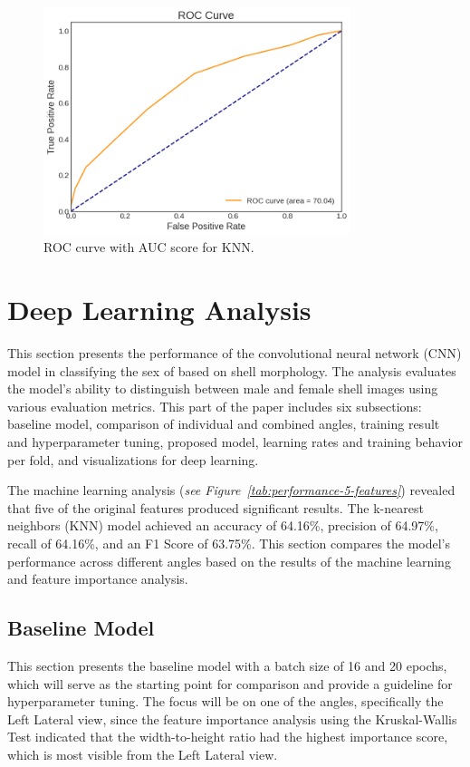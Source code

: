 \begin{figure}[!htbp]
	\centering
	\includegraphics[width=0.8\textwidth]{figures/roc_ml.png}
	\caption{ROC curve with AUC score for KNN.}
	\label{fig:roc_ml}
\end{figure}

\newpage
\section{Deep Learning Analysis}
This section presents the performance of the convolutional neural network (CNN) model in classifying the sex of \Tgranosa based on shell morphology. The analysis evaluates the model's ability to distinguish between male and female shell images using various evaluation metrics. This part of the paper includes six subsections: baseline model, comparison of individual and combined angles, training result and hyperparameter tuning, proposed model, learning rates and training behavior per fold, and visualizations for deep learning.

The machine learning analysis (\textit{see Figure~\ref{tab:performance-5-features}}) revealed that five of the original features produced significant results. The k-nearest neighbors (KNN) model achieved an accuracy of 64.16\%, precision of 64.97\%, recall of 64.16\%, and an F1 Score of 63.75\%. This section compares the model's performance across different angles based on the results of the machine learning and feature importance analysis.

\subsection{Baseline Model}
This section presents the baseline model with a batch size of 16 and 20 epochs, which will serve as the starting point for comparison and provide a guideline for hyperparameter tuning. The focus will be on one of the angles, specifically the Left Lateral view, since the feature importance analysis using the Kruskal-Wallis Test indicated that the width-to-height ratio had the highest importance score, which is most visible from the Left Lateral view.

